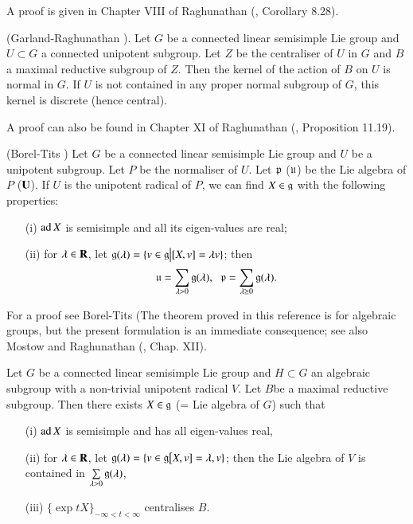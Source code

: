A proof is given in Chapter VIII of Raghunathan (\cite{art9-key1}, Corollary 8.28).

\begin{romantheorem}{\rm (Garland-Raghunathan \cite{art9-key1}).}\label{art9-romanthm4}
Let $G$ be a connected linear semisimple Lie group and $U \subset G$ a connected unipotent subgroup. Let $Z$ be the centraliser of $U$ in $G$ and $B$ a maximal reductive subgroup of $Z$. Then the kernel of the action of $B$ on $U$ is normal in $G$. If $U$ is not contained in any proper normal subgroup of $G$, this kernel is discrete (hence central).
\end{romantheorem}

A proof can also be found in Chapter XI of Raghunathan (\cite{art9-key1}, Proposition 11.19).

\begin{romantheorem}{\rm (Borel-Tits \cite{art9-key2})}\label{art9-romanthm5}
Let $G$ be a connected linear semisimple Lie group and $U$ be a unipotent subgroup. Let $P$ be the normaliser of $U$. Let $\mathfrak{p}$ (\resp $\mathfrak{u}$) be the Lie algebra of $P$ (\resp $\mathbf{U}$). If $U$ is the unipotent radical of $P$, we can find $X \in \mathfrak{g}$ with the following properties:
\begin{itemize}
\item[(i)] $\operatorname{ad} X$ is semisimple and all its eigen-values are real;

\item[(ii)] for $\lambda \in \mathbf{R}$, let $\mathfrak{g}(\lambda) = \{v \in \mathfrak{g}  \big| [X, v] = \lambda v\}$; then
$$
\mathfrak{u} = \sum\limits_{\lambda > 0} \mathfrak{g} (\lambda), \;\; \mathfrak{p} = \sum\limits_{\lambda \geq 0 } \mathfrak{g} (\lambda).
$$
\end{itemize}
 \end{romantheorem}

For a proof see Borel-Tits \cite{art9-key1} (The theorem proved in this reference is for algebraic groups, but the present formulation is an immediate consequence; see also Mostow \cite{art9-key1} and Raghunathan (\cite{art9-key1}, Chap. XII).


\begin{romancorollary}\label{art9-romancoro6}
Let $G$ be a connected linear semisimple Lie group and $H \subset G$ an algebraic subgroup with a non-trivial unipotent radical $V$.
Let $B$\pageoriginale be a maximal reductive subgroup. Then there exists $X \in \mathfrak{g}$ (= Lie algebra of $G$) such that
\begin{itemize}
\item[(i)] $\operatorname{ad} X$ is semisimple and has all eigen-values real,

\item[(ii)] for $\lambda \in \mathbf{R}$, let $\mathfrak{g} (\lambda) = \{v \in \mathfrak{g} \big [X, v] = \lambda, v\}$; then the Lie algebra of $V$ is contained in $\sum\limits_{\lambda > 0} \mathfrak{g} (\lambda)$, 

\item[(iii)] $\{\exp t X\}_{- \infty < t < \infty}$ centralises $B$.
\end{itemize}
\end{romancorollary}

